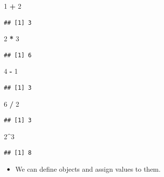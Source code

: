 \documentclass[]{book}
\newenvironment{Shaded}{\begin{snugshade}}{\end{snugshade}}
\newcommand{\DecValTok}[1]{\textcolor[rgb]{0.00,0.00,0.81}{#1}}
\newcommand{\StringTok}[1]{\textcolor[rgb]{0.31,0.60,0.02}{#1}}
\newcommand{\OperatorTok}[1]{\textcolor[rgb]{0.81,0.36,0.00}{\textbf{#1}}}
\providecommand{\tightlist}{%
  \setlength{\itemsep}{0pt}\setlength{\parskip}{0pt}}
\begin{document}
\begin{Shaded}
\begin{Highlighting}[]
\DecValTok{1} \OperatorTok{+}\StringTok{ }\DecValTok{2}
\end{Highlighting}
\end{Shaded}

\begin{verbatim}
## [1] 3
\end{verbatim}

\begin{Shaded}
\begin{Highlighting}[]
\DecValTok{2} \OperatorTok{*}\StringTok{ }\DecValTok{3}
\end{Highlighting}
\end{Shaded}

\begin{verbatim}
## [1] 6
\end{verbatim}

\begin{Shaded}
\begin{Highlighting}[]
\DecValTok{4} \OperatorTok{-}\StringTok{ }\DecValTok{1}
\end{Highlighting}
\end{Shaded}

\begin{verbatim}
## [1] 3
\end{verbatim}

\begin{Shaded}
\begin{Highlighting}[]
\DecValTok{6} \OperatorTok{/}\StringTok{ }\DecValTok{2}
\end{Highlighting}
\end{Shaded}

\begin{verbatim}
## [1] 3
\end{verbatim}

\begin{Shaded}
\begin{Highlighting}[]
\DecValTok{2}\OperatorTok{^}\DecValTok{3}
\end{Highlighting}
\end{Shaded}

\begin{verbatim}
## [1] 8
\end{verbatim}

\begin{itemize}
\tightlist
\item
  We can define objects and assign values to them.
\end{itemize}
\end{document}
